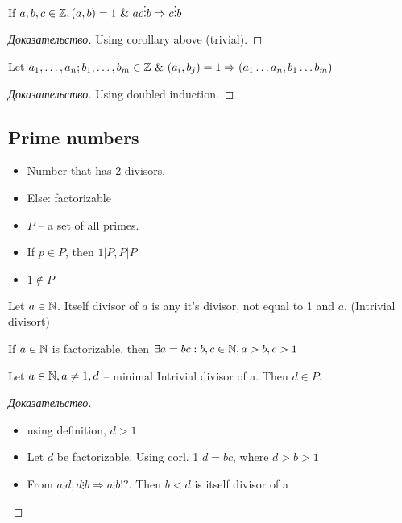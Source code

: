 \begin{property}[]
	If $a,b,c \in \mathbb{Z}, (a,b) = 1 \ \& \ ac \vdots b \Rightarrow c \vdots b$
\end{property}

\begin{proof}[Доказательство]
    Using corollary above (trivial).	
\end{proof}

\begin{property}[]
	Let $a_1, \dots , a_n; b_1, \dots , b_m \in \mathbb{Z} \ \& \ (a_i, b_j) = 1 \Rightarrow (a_1 \dots a_n, b_1 \dots b_m)$
\end{property}

\begin{proof}[Доказательство]
	Using doubled induction.
\end{proof}

\subsection{Prime numbers}

\begin{definition}[]
	\begin{itemize}
		\item Number that has 2 divisors.
		\item Else: factorizable
		\item $P$ -- a set of all primes.
		\item If $p \in P$, then $1 | P, P | P$
		\item $1 \notin P$ 
	 
	\end{itemize}
\end{definition}

\begin{definition}[]
	Let $a \in \mathbb{N}$. Itself divisor of $a$ is any it's divisor, not equal to 1 and $a$. (Intrivial divisort)
\end{definition}

\begin{property}[]
	If $a \in \mathbb{N}$ is factorizable, then $\exists a = bc: b,c \in \mathbb{N}, a > b, c > 1$
\end{property}

\begin{property}[]
	Let $a \in \mathbb{N}, a \neq 1, d$ -- minimal Intrivial divisor of a. Then $d \in P$.
\end{property}

\begin{proof}[Доказательство]
	\begin{itemize}
		\item using definition, $d > 1$
		\item Let $d$ be factorizable. Using corl. 1 $d = bc$, where  $d > b > 1$
		\item From $a \vdots d, d \vdots b \Rightarrow a \vdots b !?$. Then $b < d$ is itself divisor of a   
	\end{itemize}
\end{proof}

